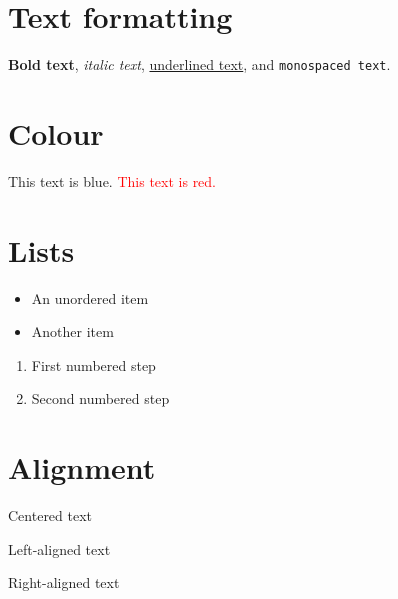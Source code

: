 \documentclass[12pt,a4paper]{article}
\begin{document}
\section{Text formatting}
\textbf{Bold text}, \textit{italic text}, \underline{underlined text},
and \texttt{monospaced text}.

\section{Colour}
{\color{blue}This text is blue.}
\textcolor{red}{This text is red.}

\section{Lists}
\begin{itemize}
  \item An unordered item
  \item Another item
\end{itemize}

\begin{enumerate}
  \item First numbered step
  \item Second numbered step
\end{enumerate}

\section{Alignment}
\begin{center}Centered text\end{center}
\begin{flushleft}Left-aligned text\end{flushleft}
\begin{flushright}Right-aligned text\end{flushright}
\end{document}
